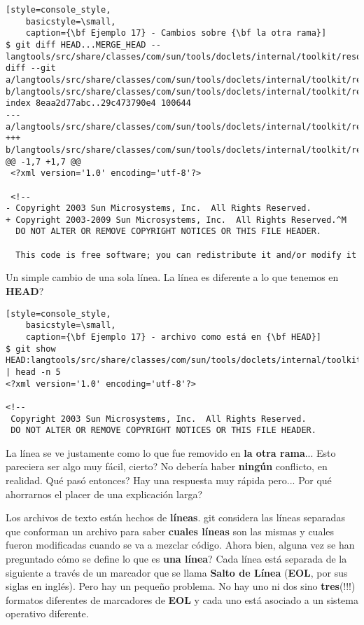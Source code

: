 \begin{lstlisting}[style=console_style,
	basicstyle=\small,
	caption={\bf Ejemplo 17} - Cambios sobre {\bf la otra rama}]
$ git diff HEAD...MERGE_HEAD -- langtools/src/share/classes/com/sun/tools/doclets/internal/toolkit/resources/doclet.xml
diff --git a/langtools/src/share/classes/com/sun/tools/doclets/internal/toolkit/resources/doclet.xml b/langtools/src/share/classes/com/sun/tools/doclets/internal/toolkit/resources/doclet.xml
index 8eaa2d77abc..29c473790e4 100644
--- a/langtools/src/share/classes/com/sun/tools/doclets/internal/toolkit/resources/doclet.xml
+++ b/langtools/src/share/classes/com/sun/tools/doclets/internal/toolkit/resources/doclet.xml
@@ -1,7 +1,7 @@
 <?xml version='1.0' encoding='utf-8'?>
 
 <!--
- Copyright 2003 Sun Microsystems, Inc.  All Rights Reserved.
+ Copyright 2003-2009 Sun Microsystems, Inc.  All Rights Reserved.^M
  DO NOT ALTER OR REMOVE COPYRIGHT NOTICES OR THIS FILE HEADER.
 
  This code is free software; you can redistribute it and/or modify it
\end{lstlisting}

Un simple cambio de una sola línea. La línea es diferente a lo que tenemos en {\bf HEAD}?

\begin{lstlisting}[style=console_style,
	basicstyle=\small,
	caption={\bf Ejemplo 17} - archivo como está en {\bf HEAD}]
$ git show HEAD:langtools/src/share/classes/com/sun/tools/doclets/internal/toolkit/resources/doclet.xml | head -n 5
<?xml version='1.0' encoding='utf-8'?>

<!--
 Copyright 2003 Sun Microsystems, Inc.  All Rights Reserved.
 DO NOT ALTER OR REMOVE COPYRIGHT NOTICES OR THIS FILE HEADER.
\end{lstlisting}

La línea se ve justamente como lo que fue removido en {\bf la otra rama}... Esto pareciera ser algo muy fácil, cierto? No debería haber
{\bf ningún} conflicto, en realidad. Qué pasó entonces? Hay una respuesta muy rápida pero... Por qué ahorrarnos el placer de una explicación
larga?

Los archivos de texto están hechos de {\bf líneas}. git considera las líneas separadas que conforman un archivo para saber {\bf cuales líneas}
son las mismas y cuales fueron modificadas cuando se va a mezclar código. Ahora bien, alguna vez se han preguntado cómo se define lo que es
{\bf una línea}? Cada línea está separada de la siguiente a través de un marcador que se llama {\bf Salto de Línea} ({\bf EOL}, por sus siglas
en inglés). Pero hay un pequeño problema. No hay uno ni dos sino {\bf tres}(!!!) formatos diferentes de marcadores de {\bf EOL} y cada uno
está asociado a un sistema operativo diferente.

